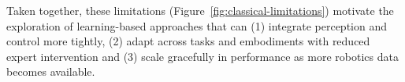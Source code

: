 Taken together, these limitations (Figure~\ref{fig:classical-limitations}) motivate the exploration of learning-based approaches that can (1) integrate perception and control more tightly, (2) adapt across tasks and embodiments with reduced expert intervention and (3) scale gracefully in performance as more robotics data becomes available.